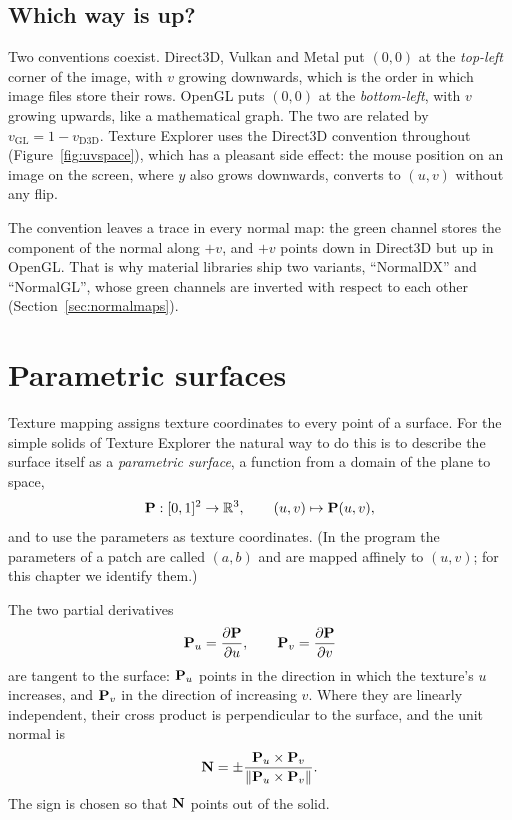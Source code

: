 \subsection{Which way is up?}
\label{sec:uvconv}
Two conventions coexist. Direct3D, Vulkan and Metal put $(0,0)$ at the \emph{top-left}
corner of the image, with $v$ growing downwards, which is the order in which image files store
their rows. OpenGL puts $(0,0)$ at the \emph{bottom-left}, with $v$ growing upwards, like a
mathematical graph. The two are related by $v_{\mathrm{GL}} = 1 - v_{\mathrm{D3D}}$.
Texture Explorer uses the Direct3D convention throughout (Figure~\ref{fig:uvspace}), which
has a pleasant side effect: the mouse position on an image on the screen, where $y$ also grows
downwards, converts to $(u,v)$ without any flip.

The convention leaves a trace in every normal map: the green channel stores the
component of the normal along $+v$, and $+v$ points down in Direct3D but up in OpenGL. That is
why material libraries ship two variants, ``NormalDX'' and ``NormalGL'', whose green channels
are inverted with respect to each other (Section~\ref{sec:normalmaps}).

\section{Parametric surfaces}

Texture mapping assigns texture coordinates to every point of a surface. For the simple
solids of Texture Explorer the natural way to do this is to describe the surface itself as a
\emph{parametric surface}, a function from a domain of the plane to space,
\[
  \mathbf{P} : [0,1]^2 \to \mathbb R^3,\qquad (u,v)\mapsto \mathbf{P}(u,v),
\]
and to use the parameters as texture coordinates. (In the program the parameters of a patch
are called $(a,b)$ and are mapped affinely to $(u,v)$; for this chapter we identify them.)

The two partial derivatives
\[
  \mathbf{P}_u = \frac{\partial \mathbf{P}}{\partial u},\qquad \mathbf{P}_v = \frac{\partial \mathbf{P}}{\partial v}
\]
are tangent to the surface: $\mathbf{P}_u$ points in the direction in which the texture's $u$
increases, and $\mathbf{P}_v$ in the direction of increasing $v$. Where they are linearly
independent, their cross product is perpendicular to the surface, and the unit normal is
\[
  \mathbf{N} = \pm\frac{\mathbf{P}_u\times\mathbf{P}_v}{\lVert\mathbf{P}_u\times\mathbf{P}_v\rVert}.
\]
The sign is chosen so that $\mathbf{N}$ points out of the solid.

